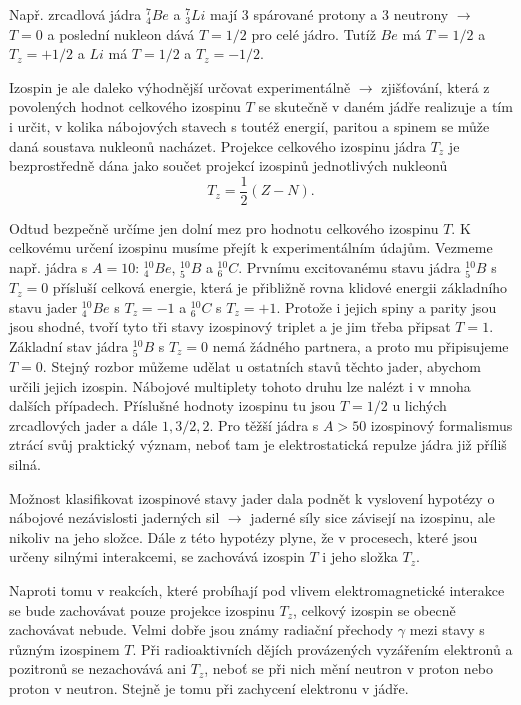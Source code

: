 \documentclass[../../main.tex]{subfiles}
\begin{document}
Např. zrcadlová jádra $^{7}_{4} Be$ a $^{7}_{3} Li$  mají 3 spárované protony a 3 neutrony $\rightarrow$ $T = 0$ a poslední nukleon dává $T = 1/2$ pro celé jádro. Tutíž $Be$ má $T=1/2$ a $T_z = +1/2$ a $Li$ má $T =1/2$ a $T_z = -1/2$.

Izospin je ale daleko výhodnější určovat experimentálně $\rightarrow$ zjišťování, která z povolených hodnot celkového izospinu $T$  se skutečně v daném jádře realizuje a tím i určit, v kolika nábojových stavech s toutéž energií, paritou a spinem se může daná soustava nukleonů nacházet. Projekce celkového izospinu jádra $T_z$ je bezprostředně dána jako součet projekcí izospinů jednotlivých nukleonů
\begin{equation}
T_z = \dfrac{1}{2} (Z - N).
\end{equation}

Odtud bezpečně určíme jen dolní mez pro hodnotu celkového izospinu $T$. K celkovému určení izospinu musíme přejít k experimentálním údajům. Vezmeme např. jádra s $A=10$:  $^{10}_{4} Be$,  $^{10}_{5} B$ a  $^{10}_{6} C$. Prvnímu excitovanému stavu jádra  $^{10}_{5} B$ s $T_z = 0$ přísluší celková energie, která je přibližně rovna klidové energii základního stavu jader  $^{10}_{4} Be$ s $T_z = -1$ a  $^{10}_{6} C$ s $T_z = +1$. Protože i jejich spiny a parity jsou jsou shodné, tvoří tyto tři stavy izospinový triplet a je jim třeba připsat $T=1$. Základní stav jádra  $^{10}_{5} B$
 s $T_z = 0$ nemá žádného partnera, a proto mu připisujeme $T = 0$. Stejný rozbor můžeme udělat u ostatních stavů těchto jader, abychom určili jejich izospin. Nábojové multiplety tohoto druhu lze nalézt i v mnoha dalších případech. Příslušné hodnoty izospinu tu jsou $T = 1/2$ u lichých zrcadlových jader a dále $1, 3/2, 2$. Pro těžší jádra s $A > 50$ izospinový formalismus ztrácí svůj praktický význam, neboť tam je elektrostatická repulze jádra již příliš silná.
 
Možnost klasifikovat izospinové stavy jader dala podnět k vyslovení hypotézy o nábojové nezávislosti jaderných sil $\rightarrow$ jaderné síly sice závisejí na izospinu, ale nikoliv na jeho složce. Dále z této hypotézy plyne, že v procesech, které jsou určeny silnými interakcemi, se zachovává izospin $T$ i jeho složka $T_z$. 

Naproti tomu v reakcích, které probíhají pod vlivem elektromagnetické interakce se bude zachovávat pouze projekce izospinu $T_z$, celkový izospin se obecně zachovávat nebude. Velmi dobře jsou známy radiační přechody $\gamma$ mezi stavy s různým izospinem $T$. Při radioaktivních dějích provázených vyzářením elektronů a pozitronů se nezachovává ani $T_z$, neboť se při nich mění neutron v proton nebo proton v neutron. Stejně je tomu při zachycení elektronu v jádře.  
\end{document}

